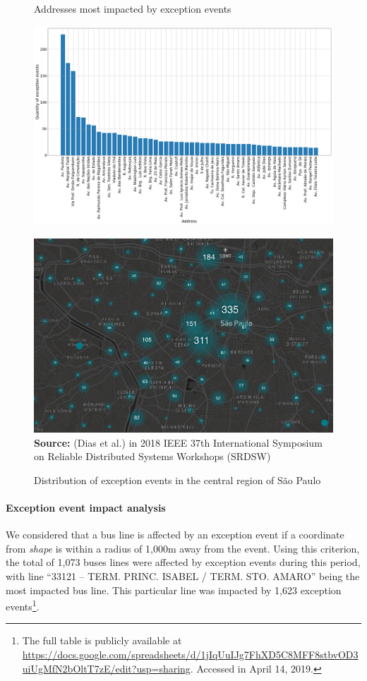 \documentclass[runningheads]{llncs}
\begin{document}
\begin{figure}
\centering
\begin{minipage}{.5\textwidth}
  \centering
    \caption{Addresses most impacted by exception events}
    \includegraphics[width=1\linewidth]{address_analysis.png}
  \label{fig:address_analysis}
\end{minipage}%
\begin{minipage}{.5\textwidth}
  \centering
    \caption{Distribution of exception events in the central region of São Paulo}
    \includegraphics[width=1\linewidth]{exception_events_sp.png}
      \textbf{Source:} (Dias et al.) in 2018 IEEE 37th International Symposium on Reliable Distributed Systems Workshops (SRDSW)
  \label{fig:dispersion}
\end{minipage}
\end{figure}

\paragraph{\textbf{Exception event impact analysis}}
We considered that a bus line is affected by an exception event if a coordinate from \textit{shape} is within a radius of 1,000m away from the event. Using this criterion, the total of 1,073 buses lines were affected by exception events during this period, with line ``33121 -- TERM. PRINC. ISABEL / TERM. STO. AMARO'' being the most impacted bus line. This particular line was impacted by 1,623 exception events\footnote{The full table is publicly available at \url{https://docs.google.com/spreadsheets/d/1jIqUuIJg7FhXD5C8MFF8stbvOD3uiUgMfN2bOltT7zE/edit?usp=sharing}. Accessed in April 14, 2019.}.
\end{document}
